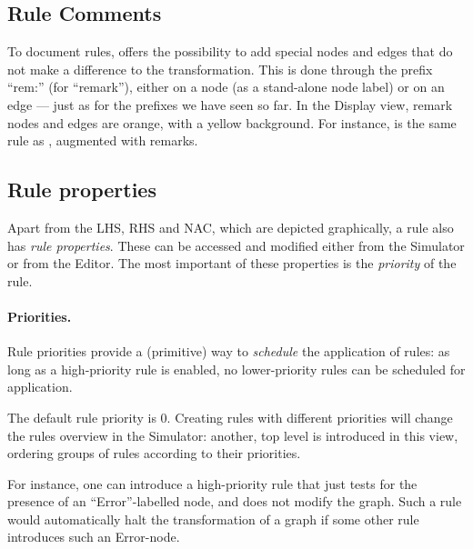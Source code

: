 
\subsection{Rule Comments}

To document rules, \Groove{} offers the possibility to add special nodes and
edges that do not make a difference to the transformation. This is done through
the prefix ``\textsf{rem:}'' (for ``remark''), either on a node (as a
stand-alone node label) or on an edge --- just as for the prefixes we have seen
so far. In the Display view, remark nodes and edges are orange, with a yellow
background. For instance,  is the same rule as ,
augmented with remarks.


\subsection{Rule properties}

Apart from the LHS, RHS and NAC, which are depicted graphically, a rule also
has \emph{rule properties}. These can be accessed and modified either from the
Simulator or from the Editor. The most important of these properties is the
\emph{priority} of the rule. 

\paragraph{Priorities.}

Rule priorities provide a (primitive) way to
\emph{schedule} the application of rules: as long as a high-priority rule is
enabled, no lower-priority rules can be scheduled for application.

The default rule priority is 0. Creating rules with different priorities will
change the rules overview in the Simulator: another, top level is introduced in
this view, ordering groups of rules according to their priorities.

For instance, one can introduce a high-priority rule that just tests for the
presence of an ``\textsf{Error}''-labelled node, and does not modify the
graph. Such a rule would automatically halt the transformation of a graph if
some other rule introduces such an \textsf{Error}-node.

